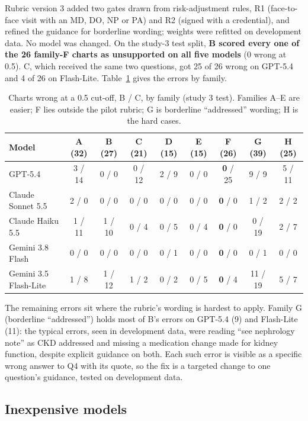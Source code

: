 \documentclass[10pt,letterpaper]{article}
\begin{document}
Rubric version 3 added two gates drawn from risk-adjustment rules, R1 (face-to-face visit with an MD, DO, NP or PA) and R2 (signed with a credential), and refined the guidance for borderline wording; weights were refitted on development data. No model was changed. On the study-3 test split, \textbf{B scored every one of the 26 family-F charts as unsupported on all five models} (0 wrong at 0.5). C, which received the same two questions, got 25 of 26 wrong on GPT-5.4 and 4 of 26 on Flash-Lite. Table~\ref{tab:families} gives the errors by family.

\begin{table}[!htbp]
\centering\small
\caption{Charts wrong at a 0.5 cut-off, B / C, by family (study 3 test). Families A--E are easier; F lies outside the pilot rubric; G is borderline ``addressed'' wording; H is the hard cases.}\label{tab:families}
\begin{tabular}{@{}lcccccccc@{}}
\toprule
Model & A (32) & B (27) & C (21) & D (15) & E (15) & F (26) & G (39) & H (25) \\
\midrule
GPT-5.4 & 3 / 14 & 0 / 0 & 0 / 12 & 2 / 9 & 0 / 0 & \textbf{0} / 25 & 9 / 9 & 5 / 11 \\
Claude Sonnet 5.5 & 2 / 0 & 0 / 0 & 0 / 0 & 0 / 0 & 0 / 0 & \textbf{0} / 0 & 1 / 2 & 2 / 2 \\
Claude Haiku 5.5 & 1 / 11 & 1 / 10 & 0 / 4 & 0 / 5 & 0 / 4 & \textbf{0} / 0 & 0 / 19 & 2 / 7 \\
Gemini 3.8 Flash & 0 / 0 & 0 / 0 & 0 / 0 & 0 / 1 & 0 / 0 & \textbf{0} / 0 & 0 / 1 & 0 / 0 \\
Gemini 3.5 Flash-Lite & 1 / 8 & 1 / 12 & 1 / 2 & 0 / 2 & 0 / 5 & \textbf{0} / 4 & 11 / 19 & 5 / 7 \\
\bottomrule
\end{tabular}
\end{table}

The remaining errors sit where the rubric's wording is hardest to apply. Family G (borderline ``addressed'') holds most of B's errors on GPT-5.4 (9) and Flash-Lite (11): the typical errors, seen in development data, were reading ``see nephrology note'' as CKD addressed and missing a medication change made for kidney function, despite explicit guidance on both. Each such error is visible as a specific wrong answer to Q4 with its quote, so the fix is a targeted change to one question's guidance, tested on development data.

\FloatBarrier
\subsection{Inexpensive models}\label{sec:results-cost}
\end{document}
